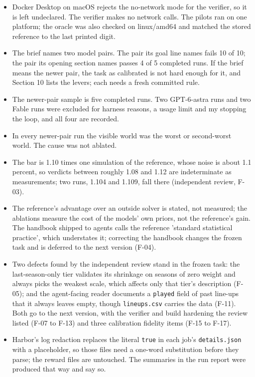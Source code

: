 \documentclass[11pt,letterpaper]{article}
\begin{document}
\begin{itemize}[leftmargin=1.4em, itemsep=2pt]
\item Docker Desktop on macOS rejects the no-network mode for the verifier, so it is left undeclared. The verifier makes no network calls. The pilots ran on one platform; the oracle was also checked on linux/amd64 and matched the stored reference to the last printed digit.
\item The brief names two model pairs. The pair its goal line names fails 10 of 10; the pair its opening section names passes 4 of 5 completed runs. If the brief means the newer pair, the task as calibrated is not hard enough for it, and Section 10 lists the levers; each needs a fresh committed rule.
\item The newer-pair sample is five completed runs. Two GPT-6-astra runs and two Fable runs were excluded for harness reasons, a usage limit and my stopping the loop, and all four are recorded.
\item In every newer-pair run the visible world was the worst or second-worst world. The cause was not ablated.
\item The bar is 1.10 times one simulation of the reference, whose noise is about 1.1 percent, so verdicts between roughly 1.08 and 1.12 are indeterminate as measurements; two runs, 1.104 and 1.109, fall there (independent review, F-03).
\item The reference's advantage over an outside solver is stated, not measured; the ablations measure the cost of the models' own priors, not the reference's gain. The handbook shipped to agents calls the reference 'standard statistical practice', which understates it; correcting the handbook changes the frozen task and is deferred to the next version (F-04).
\item Two defects found by the independent review stand in the frozen task: the last-season-only tier validates its shrinkage on seasons of zero weight and always picks the weakest scale, which affects only that tier's description (F-05); and the agent-facing reader documents a \texttt{played} field of past line-ups that it always leaves empty, though \texttt{lineups.csv} carries the data (F-11). Both go to the next version, with the verifier and build hardening the review listed (F-07 to F-13) and three calibration fidelity items (F-15 to F-17).
\item Harbor's log redaction replaces the literal \texttt{true} in each job's \texttt{details.json} with a placeholder, so those files need a one-word substitution before they parse; the reward files are untouched. The summaries in the run report were produced that way and say so.
\end{itemize}
\end{document}
